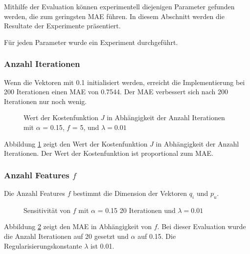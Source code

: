 \documentclass[a4paper, 12pt]{article}
\begin{document}
Mithilfe der Evaluation können experimentell diejenigen Parameter gefunden werden, die zum geringsten MAE führen. In diesem Abschnitt werden die Resultate der Experimente präsentiert. 

Für jeden Parameter wurde ein Experiment durchgeführt.

\subsubsection{Anzahl Iterationen}

Wenn die Vektoren mit 0.1 initialisiert werden, erreicht die Implementierung bei 200 Iterationen einen MAE von 0.7544. Der MAE verbessert sich nach 200 Iterationen nur noch wenig. 

\begin{figure}
  \centering
{}
\caption{Wert der Kostenfunktion $J$ in Abhängigkeit der Anzahl Iterationen mit $\alpha$ = 0.15, $f$ = 5, und $\lambda=0.01$}
\label{fig:itercostj}
\end{figure}

Abbildung \ref{fig:itercostj} zeigt den Wert der Kostenfunktion $J$ in Abhängigkeit der Anzahl Iterationen. Der Wert der Kostenfunktion ist proportional zum MAE.

\subsubsection{Anzahl Features $f$}

Die Anzahl Features $f$ bestimmt die Dimension der Vektoren $q_i$ und $p_u$.

\begin{figure}
  \centering
{}
\caption{Sensitivität von $f$ mit $\alpha$ = 0.15 20 Iterationen und $\lambda=0.01$}
\label{fig:sensf}
\end{figure}

Abbildung \ref{fig:sensf} zeigt den MAE in Abhängigkeit von $f$. Bei dieser Evaluation wurde die Anzahl Iterationen auf 20 gesetzt und $\alpha$ auf 0.15. Die Regularisierungskonstante $\lambda$ ist 0.01.
\end{document}
